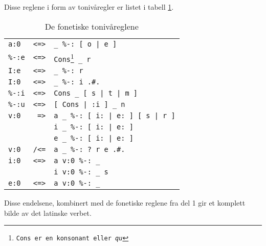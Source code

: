 \documentclass[a4paper]{article}
\begin{document}
Disse reglene i form av toniv\aa{}regler er listet i tabell \ref{twolc}.

\begin{table}[hp]
\begin{minipage}{\textwidth}
\begin{center}
\begin{tabular}{rcl}
\texttt{a:0  } & \texttt{<=>} & \texttt{\_ \%-: [ o | e ]} \\
\texttt{\%-:e} & \texttt{<=>} & \texttt{Cons\footnote{\texttt{Cons} er en konsonant eller \emph{qu} } \_ r} \\
\texttt{I:e  } & \texttt{<=>} & \texttt{\_ \%-: r} \\
\texttt{I:0  } & \texttt{<=>} & \texttt{\_ \%-: i .\#.} \\
\texttt{\%-:i} & \texttt{<=>} & \texttt{Cons \_ [ s | t | m ]} \\
\texttt{\%-:u} & \texttt{<=>} & \texttt{[ Cons | :i ] \_ n} \\
\texttt{v:0  } & \texttt{ =>} & \texttt{a \_ \%-: [ i: | e: ] [ s | r ]} \\
\texttt{     } & \texttt{   } & \texttt{i \_ \%-: [ i: | e: ]} \\
\texttt{     } & \texttt{   } & \texttt{e \_ \%-: [ i: | e: ]} \\
\texttt{v:0  } & \texttt{/<=} & \texttt{a \_ \%-: ? r e .\#.} \\
\texttt{i:0  } & \texttt{<=>} & \texttt{a v:0 \%-: \_} \\
\texttt{     } & \texttt{   } & \texttt{i v:0 \%-: \_ s} \\
\texttt{e:0  } & \texttt{<=>} & \texttt{a v:0 \%-: \_} \\
\end{tabular}
\end{center}
\end{minipage}
\caption{De fonetiske toniv\aa{}reglene}
\label{twolc}
\end{table}

Disse endelsene, kombinert med de fonetiske reglene fra del 1 gir et komplett
bilde av det latinske verbet.


{}
\end{document}
